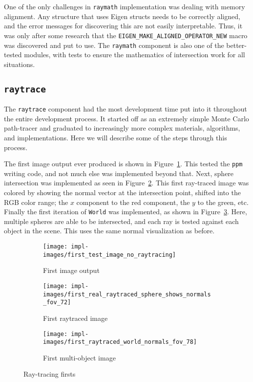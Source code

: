 One of the only challenges in \texttt{raymath} implementation was dealing with memory alignment.
Any structure that uses Eigen structs needs to be correctly aligned, and the error messages for discovering this are not easily interpretable.
Thus, it was only after some research that the \texttt{EIGEN\_MAKE\_ALIGNED\_OPERATOR\_NEW} macro was discovered and put to use.
The \texttt{raymath} component is also one of the better-tested modules, with tests to ensure the mathematics of intersection work for all situations.

\subsection{\texttt{raytrace}}\label{ch:implementation:prototype:raytrace}

The \texttt{raytrace} component had the most development time put into it throughout the entire \name{} development process.
It started off as an extremely simple Monte Carlo path-tracer and graduated to increasingly more complex materials, algorithms, and implementations.
Here we will describe some of the steps through this process.

The first image output ever produced is shown in Figure~\ref{fig:rayterm-cpu_ppm_output_first}.
This tested the \texttt{ppm} writing code, and not much else was implemented beyond that.
Next, sphere intersection was implemented as seen in Figure~\ref{fig:rayterm-cpu_first_raytraced_image}.
This first ray-traced image was colored by showing the normal vector at the intersection point, shifted into the RGB color range; the $x$ component to the red component, the $y$ to the green, etc.
Finally the first iteration of \texttt{World} was implemented, as shown in Figure~\ref{fig:rayterm-cpu_first_multiobject_raytraced_image}.
Here, multiple spheres are able to be intersected, and each ray is tested against each object in the scene.
This uses the same normal visualization as before.


\vspace{0.3em}
\begin{figure}[htb]
  \centering
  \begin{subfigure}[htb]{0.2\textwidth}
    \texttt{[image: impl-images/first\_test\_image\_no\_raytracing]}
    \caption{First image output}
\label{fig:rayterm-cpu_ppm_output_first}
  \end{subfigure}
  \begin{subfigure}[htb]{0.35\textwidth}
    \texttt{[image: impl-images/first\_real\_raytraced\_sphere\_shows\_normals\_fov\_72]}
    \caption{First raytraced image}
\label{fig:rayterm-cpu_first_raytraced_image}
  \end{subfigure}
  \begin{subfigure}[htb]{0.4\textwidth}
    \centering
    \texttt{[image: impl-images/first\_raytraced\_world\_normals\_fov\_78]}
    \caption{First multi-object image}
\label{fig:rayterm-cpu_first_multiobject_raytraced_image}
  \end{subfigure}
  \caption{Ray-tracing firsts}
\label{fig:rayterm-cpu_firsts}
\end{figure}

